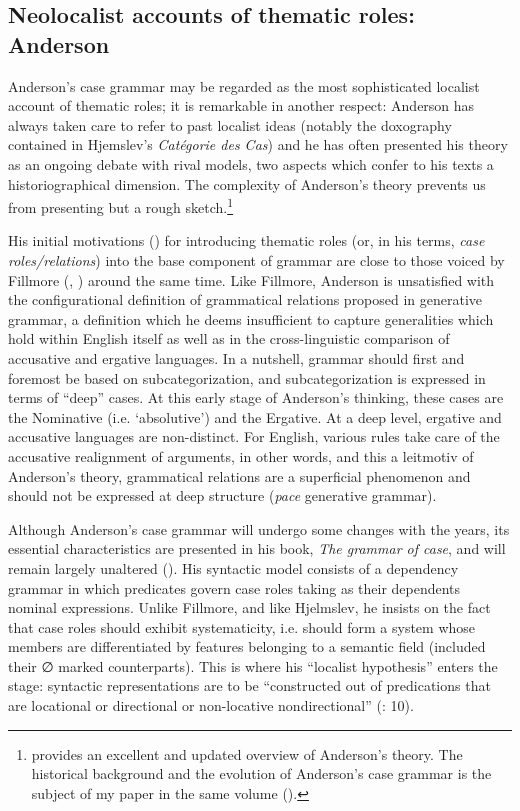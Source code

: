 \documentclass[output=paper]{langscibook}
\begin{document}
\subsection{Neolocalist accounts of thematic roles: Anderson}\largerpage

Anderson’s case grammar may be regarded as the most sophisticated localist account of thematic roles; it is remarkable in another respect: Anderson has always taken care to refer to past localist ideas (notably the doxography contained in Hjemslev’s \textit{Catégorie des Cas}) and he has often presented his theory as an ongoing debate with rival models, two aspects which confer to his texts a historiographical dimension. The complexity of Anderson’s theory prevents us from presenting but a rough sketch.{\footnote{\citet{bohm_investigating_2018} provides an excellent and updated overview of Anderson’s theory. The historical background and the evolution of Anderson’s case grammar is the subject of my paper in the same volume (\citealt{bohm_andersons_2018}).}}

His initial motivations (\citealt{anderson_ergative_1968}) for introducing thematic roles (or, in his terms, \textit{case roles\slash relations}) into the base component of grammar are close to those voiced by Fillmore (\citeyear{fillmore_toward_1966}, \citeyear{bach_case_1968}) around the same time. Like Fillmore, Anderson is unsatisfied with the configurational definition of grammatical relations proposed in generative grammar, a definition which he deems insufficient to capture generalities which hold within English itself as well as in the cross-linguistic comparison of accusative and ergative languages. In a nutshell, grammar should first and foremost be based on subcategorization, and subcategorization is expressed in terms of “deep” cases. At this early stage of Anderson’s thinking, these cases are the Nominative (i.e. ‘absolutive’) and the Ergative. At a deep level, ergative and accusative languages are non-distinct. For English, various rules take care of the accusative realignment of arguments, in other words, and this a leitmotiv of Anderson’s theory, grammatical relations are a superficial phenomenon and should not be expressed at deep structure (\textit{pace} generative grammar).

Although Anderson’s case grammar will undergo some changes with the years, its essential characteristics are presented in his \citeyear{anderson_grammar_1971} book, \textit{The grammar of case}, and will remain largely unaltered (\citealt{bohm_andersons_2018}). His syntactic model consists of a dependency grammar in which predicates govern case roles taking as their dependents nominal expressions. Unlike Fillmore, and like Hjelmslev, he insists on the fact that case roles should exhibit systematicity, i.e. should form a system whose members are differentiated by features belonging to a semantic field (included their ∅ marked counterparts). This is where his “localist hypothesis” enters the stage: syntactic representations are to be “constructed out of predications that are locational or directional or non-locative nondirectional” (\citealt{anderson_essay_1973}: 10).
\end{document}
